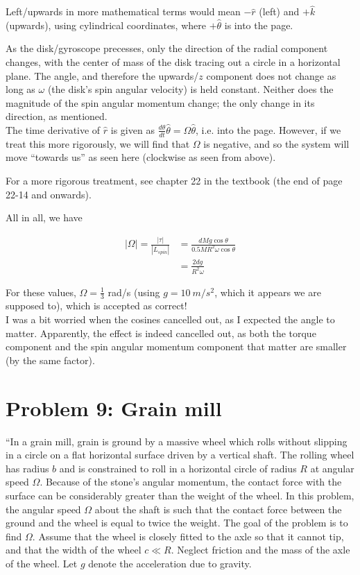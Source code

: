 \documentclass[8.01x]{subfiles}
\begin{document}
Left/upwards in more mathematical terms would mean $-\hat{r}$ (left) and $+\hat{k}$ (upwards), using cylindrical coordinates, where $+\hat{\theta}$ is into the page.

As the disk/gyroscope precesses, only the direction of the radial component changes, with the center of mass of the disk tracing out a circle in a horizontal plane. The angle, and therefore the upwards/$z$ component does not change as long as $\omega$ (the disk's spin angular velocity) is held constant. Neither does the magnitude of the spin angular momentum change; the only change in its direction, as mentioned.\\
The time derivative of $\hat{r}$ is given as $\displaystyle \frac{d\theta}{dt} \hat{\theta} = \Omega \hat{\theta}$, i.e. into the page. However, if we treat this more rigorously, we will find that $\Omega$ is negative, and so the system will move ``towards us'' as seen here (clockwise as seen from above).

For a more rigorous treatment, see chapter 22 in the textbook (the end of page 22-14 and onwards).

All in all, we have

\begin{align}
|\Omega| = \frac{|\tau|}{|L_{spin}|} &= \frac{d M g \cos \theta}{0.5 M R^2 \omega \cos \theta}\\
                                     &= \frac{2 d g}{R^2 \omega}
\end{align}

For these values, $\Omega = \frac{1}{3}$ rad/s (using $g = \SI{10}{m/s^2}$, which it appears we are supposed to), which is accepted as correct!\\
I was a bit worried when the cosines cancelled out, as I expected the angle to matter. Apparently, the effect is indeed cancelled out, as both the torque component and the spin angular momentum component that matter are smaller (by the same factor).

\section{Problem 9: Grain mill}

``In a grain mill, grain is ground by a massive wheel which rolls without slipping in a circle on a flat horizontal surface driven by a vertical shaft. The rolling wheel has radius $b$ and is constrained to roll in a horizontal circle of radius $R$ at angular speed $\Omega$. Because of the stone's angular momentum, the contact force with the surface can be considerably greater than the weight of the wheel. In this problem, the angular speed $\Omega$ about the shaft is such that the contact force between the ground and the wheel is equal to twice the weight. The goal of the problem is to find $\Omega$. Assume that the wheel is closely fitted to the axle so that it cannot tip, and that the width of the wheel $c \ll R$. Neglect friction and the mass of the axle of the wheel. Let $g$ denote the acceleration due to gravity.
\end{document}
